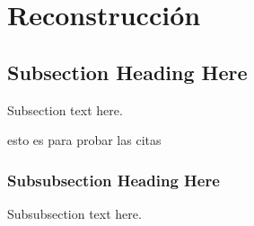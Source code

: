 \section{Reconstrucción}

\subsection{Subsection Heading Here}
Subsection text here.


esto es para probar las citas \cite{herda}

\subsubsection{Subsubsection Heading Here}
Subsubsection text here.
